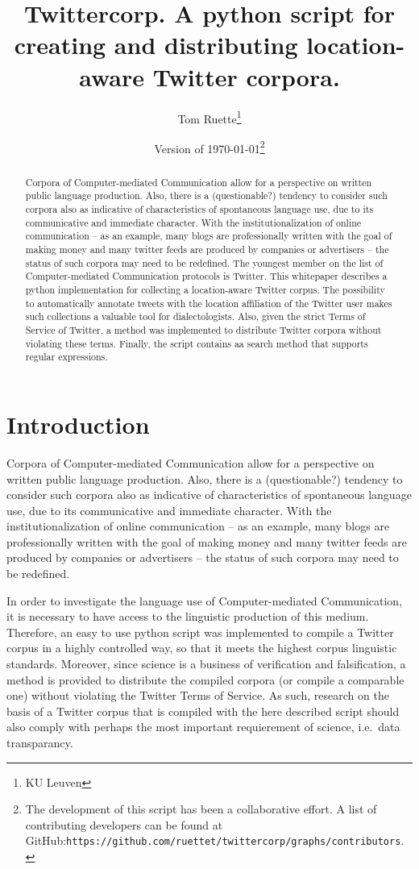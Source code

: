 \documentclass[a4paper,10pt]{article}
\title{Twittercorp. A python script for creating and distributing location-aware Twitter corpora.}
\author{Tom Ruette\thanks{KU Leuven}}
\date{Version of \today\thanks{The development of this script has been a collaborative effort. A list of contributing developers can be found at GitHub:\newline \texttt{https://github.com/ruettet/twittercorp/graphs/contributors}.}}
\begin{document}
\maketitle

\begin{abstract}
Corpora of Computer-mediated Communication allow for a perspective on written public language production. Also, there is a (questionable?) tendency to consider such corpora also as indicative of characteristics of spontaneous language use, due to its communicative and immediate character. With the institutionalization of online communication -- as an example, many blogs are professionally written with the goal of making money and many twitter feeds are produced by companies or advertisers -- the status of such corpora may need to be redefined. The youngest member on the list of Computer-mediated Communication protocols is Twitter. This whitepaper describes a python implementation for collecting a location-aware Twitter corpus. The possibility to automatically annotate tweets with the location affiliation of the Twitter user makes such collections a valuable tool for dialectologists. Also, given the strict Terms of Service of Twitter, a method was implemented to distribute Twitter corpora without violating these terms. Finally, the script contains aa search method that supports regular expressions.
\end{abstract}

\section{Introduction}

Corpora of Computer-mediated Communication allow for a perspective on written public language production. Also, there is a (questionable?) tendency to consider such corpora also as indicative of characteristics of spontaneous language use, due to its communicative and immediate character. With the institutionalization of online communication -- as an example, many blogs are professionally written with the goal of making money and many twitter feeds are produced by companies or advertisers -- the status of such corpora may need to be redefined.

In order to investigate the language use of Computer-mediated Communication, it is necessary to have access to the linguistic production of this medium. Therefore, an easy to use python script was implemented to compile a Twitter corpus in a highly controlled way, so that it meets the highest corpus linguistic standards. Moreover, since science is a business of verification and falsification, a method is provided to distribute the compiled corpora (or compile a comparable one) without violating the Twitter Terms of Service. As such, research on the basis of a Twitter corpus that is compiled with the here described script should also comply with perhaps the most important requierement of science, i.e.~data transparancy.
\end{document}
